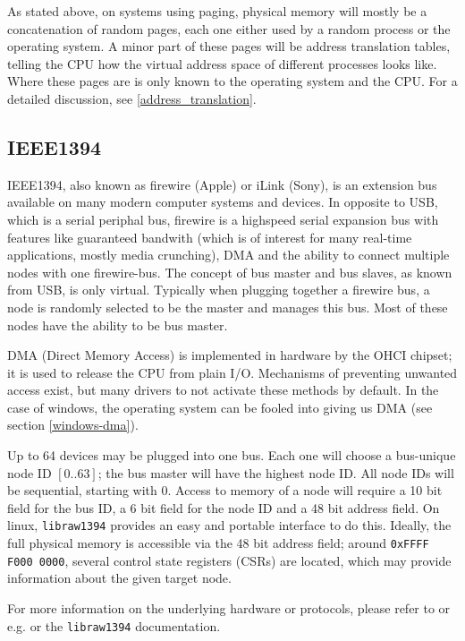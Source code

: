 As stated above, on systems using paging, physical memory will mostly be a
concatenation of random pages, each one either used by a random process or the
operating system. A minor part of these pages will be address translation
tables, telling the CPU how the virtual address space of different processes
looks like. Where these pages are is only known to the operating system and the
CPU. For a detailed discussion, see \ref{address_translation}.



\subsection{IEEE1394}

IEEE1394, also known as firewire (Apple) or iLink (Sony), is an extension bus
available on many modern computer systems and devices.  In opposite to USB,
which is a serial periphal bus, firewire is a highspeed serial expansion bus
with features like guaranteed bandwith (which is of interest for many real-time
applications, mostly media crunching), DMA and the ability to connect multiple
nodes with one firewire-bus. The concept of bus master and bus slaves, as known
from USB, is only virtual. Typically when plugging together a firewire bus, a
node is randomly selected to be the master and manages this bus. Most of these
nodes have the ability to be bus master.

DMA (Direct Memory Access) is implemented in hardware by the OHCI chipset; it
is used to release the CPU from plain I/O. Mechanisms of preventing unwanted
access exist, but many drivers to not activate these methods by default. In the
case of windows, the operating system can be fooled into giving us DMA (see
section \ref{windows-dma}).

Up to 64 devices may be plugged into one bus. Each one will choose a bus-unique
node ID $[0..63]$; the bus master will have the highest node ID. All node IDs
will be sequential, starting with 0. Access to memory of a node will require a
10 bit field for the bus ID, a 6 bit field for the node ID and a 48 bit address
field.  On linux, \texttt{libraw1394} provides an easy and portable interface to
do this. Ideally, the full physical memory is accessible via the 48 bit address
field; around \texttt{0xFFFF F000 0000}, several control state registers (CSRs)
are located, which may provide information about the given target node.

For more information on the underlying hardware or protocols, please refer to
\cite{OHCIspecs:2000} or e.g. \cite{fwire_sys_arch:2222} or the
\texttt{libraw1394} documentation.



